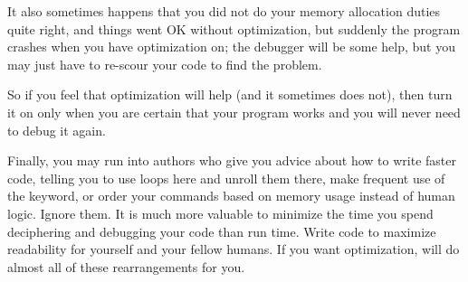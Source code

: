 \documentclass[12pt]{article}
\makeatletter
\def\ttind#1{\index{#1@\cinline{#1}}\cinline{#1}}
\makeatother
\begin{document}
It also sometimes happens that you did not do your memory allocation duties
quite right, and things went OK without optimization, but suddenly the
program crashes when you have optimization on; the debugger will be some
help, but you may just have to re-scour your code to find the problem.

So if you feel that optimization will help (and it sometimes does not),
then turn it on only when you are certain that your program works and
you will never need to debug it again.

Finally, you may run into authors who give you advice about how to write
faster code, telling you to use loops here and unroll them there, make
frequent use of the \ttind{inline} keyword, or order your commands based
on memory usage instead of human logic. Ignore them. It is much more
valuable to minimize the time you spend deciphering and debugging your
code than run time.  Write code to maximize readability for yourself
and your fellow humans. If you want optimization,  will
do almost all of these rearrangements for you.

\label{end_c_crash}
\ifbook \else
\printindex
\end{document}
